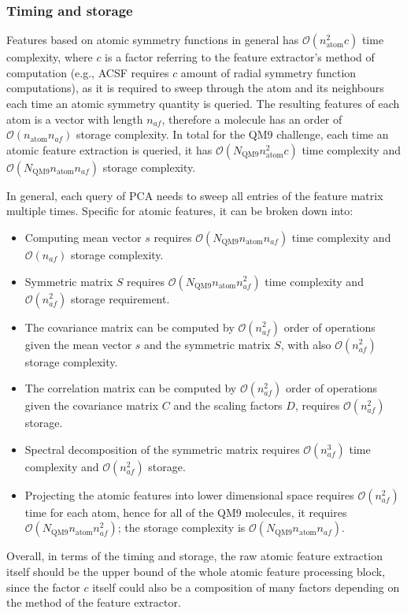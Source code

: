 \documentclass[12pt]{article}
\begin{document}
\subsubsection{Timing and storage}
Features based on atomic symmetry functions in general has $\mathcal{O}(n_\text{atom}^2c)$ time complexity, where $c$ is a factor referring to the feature extractor's method of computation (e.g., ACSF requires $c$ amount of radial symmetry function computations), as it is required to sweep through the atom and its neighbours each time an atomic symmetry quantity is queried. The resulting features of each atom is a vector with length $n_{af}$, therefore a molecule has an order of $\mathcal{O}(n_\text{atom}n_{af})$ storage complexity. In total for the QM9 challenge, each time an atomic feature extraction is queried, it has $\mathcal{O}(N_\text{QM9}n_\text{atom}^2c)$ time complexity and $\mathcal{O}(N_\text{QM9}n_\text{atom}n_{af})$ storage complexity.

In general, each query of PCA needs to sweep all entries of the feature matrix multiple times. Specific for atomic features, it can be broken down into:
\begin{itemize}
	\item Computing mean vector $s$ requires $\mathcal{O}(N_\text{QM9}n_\text{atom}n_{af})$ time complexity and $\mathcal{O}(n_{af})$ storage complexity.
	\item Symmetric matrix $S$ requires $\mathcal{O}(N_\text{QM9}n_\text{atom}n^2_{af})$ time complexity and $\mathcal{O}(n^2_{af})$ storage requirement.
	\item The covariance matrix can be computed by $\mathcal{O}(n^2_{af})$ order of operations given the mean vector $s$ and the symmetric matrix $S$, with also $\mathcal{O}(n^2_{af})$ storage complexity.
	\item The correlation matrix can be computed by $\mathcal{O}(n^2_{af})$ order of operations given the covariance matrix $C$ and the scaling factors $D$, requires $\mathcal{O}(n^2_{af})$ storage.
	\item Spectral decomposition of the symmetric matrix requires $\mathcal{O}(n^3_{af})$ time complexity and $\mathcal{O}(n^2_{af})$ storage.
	\item Projecting the atomic features into lower dimensional space requires $\mathcal{O}(n^2_{af})$ time for each atom, hence for all of the QM9 molecules, it requires $\mathcal{O}(N_\text{QM9}n_\text{atom}n^2_{af})$; the storage complexity is $\mathcal{O}(N_\text{QM9}n_\text{atom}n_{af})$.
\end{itemize}
Overall, in terms of the timing and storage, the raw atomic feature extraction itself should be the upper bound of the whole atomic feature processing block, since the factor $c$ itself could also be a composition of many factors depending on the method of the feature extractor.
\end{document}
